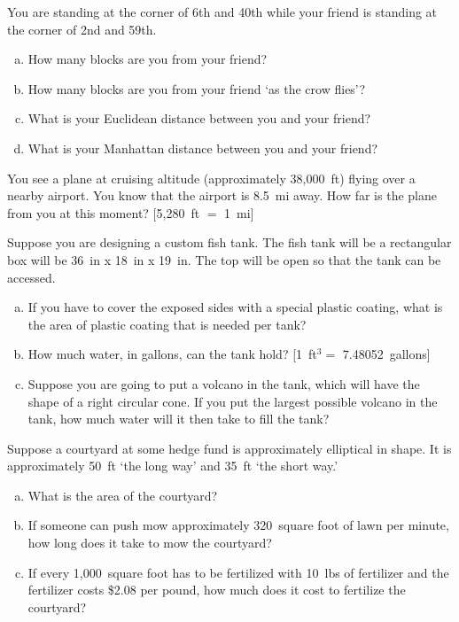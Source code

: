 \documentclass[11pt,letterpaper]{article}
\begin{document}

 You are standing at the corner of 6th and 40th while your friend is standing at the corner of 2nd and 59th.
	\begin{enumerate}[(a)]
	\item How many blocks are you from your friend?
	\item How many blocks are you from your friend `as the crow flies'?
	\item What is your Euclidean distance between you and your friend?
	\item What is your Manhattan distance between you and your friend?
	\end{enumerate}



\newpage



 You see a plane at cruising altitude (approximately 38,000~ft) flying over a nearby airport. You know that the airport is 8.5~mi away. How far is the plane from you at this moment? [5,280~ft $=$ 1~mi]



\newpage



 Suppose you are designing a custom fish tank. The fish tank will be a rectangular box will be 36~in x 18~in x 19~in. The top will be open so that the tank can be accessed. 
	\begin{enumerate}[(a)]
	\item If you have to cover the exposed sides with a special plastic coating, what is the area of plastic coating that is needed per tank?
	\item How much water, in gallons, can the tank hold? [1~ft$^3 =$ 7.48052~gallons]
	\item Suppose you are going to put a volcano in the tank, which will have the shape of a right circular cone. If you put the largest possible volcano in the tank, how much water will it then take to fill the tank?
	\end{enumerate}



\newpage



 Suppose a courtyard at some hedge fund is approximately elliptical in shape. It is approximately 50~ft `the long way' and 35~ft `the short way.'
	\begin{enumerate}[(a)]
	\item What is the area of the courtyard?
	\item If someone can push mow approximately 320~square foot of lawn per minute, how long does it take to mow the courtyard?
	\item If every 1,000~square foot has to be fertilized with 10~lbs of fertilizer and the fertilizer costs \$2.08 per pound, how much does it cost to fertilize the courtyard?
	\end{enumerate}
\end{document}
